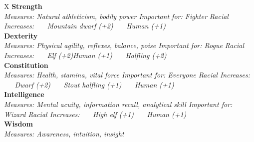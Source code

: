 \begin{DndTable}[header=Ability Score Summary]{X}
   \textbf{Strength} \\
  \hiderowcolors \textit{Measures: Natural athleticism, bodily power \newline
    Important for: Fighter \newline
    Racial Increases: \newline
    \ \ \ Mountain dwarf (+2) \newline
    \ \ \ Human (+1)
    \newline } \\
   \textbf{Dexterity} \\
  \hiderowcolors \textit{Measures: Physical agility, reflexes, balance, poise \newline
    Important for: Rogue \newline
    Racial Increases: \newline
    \ \ \ Elf (+2)\tab Human (+1) \newline
    \ \ \ Halfling (+2) \newline
    \newline } \\
   \textbf{Constitution} \\
  \hiderowcolors \textit{Measures: Health, stamina, vital force \newline
    Important for: Everyone \newline
    Racial Increases: \newline
    \ \ \ Dwarf (+2) \newline
    \ \ \ Stout halfling (+1) \newline
    \ \ \ Human (+1) \newline
    \newline } \\
   \textbf{Intelligence} \\
  \hiderowcolors \textit{Measures: Mental acuity, information recall, analytical skill \newline
    Important for: Wizard \newline
    Racial Increases: \newline
    \ \ \ High elf (+1) \newline
    \ \ \ Human (+1)
    \newline } \\
   \textbf{Wisdom} \\
  \hiderowcolors \textit{Measures: Awareness, intuition, insight \newline
}
\end{DndTable}
